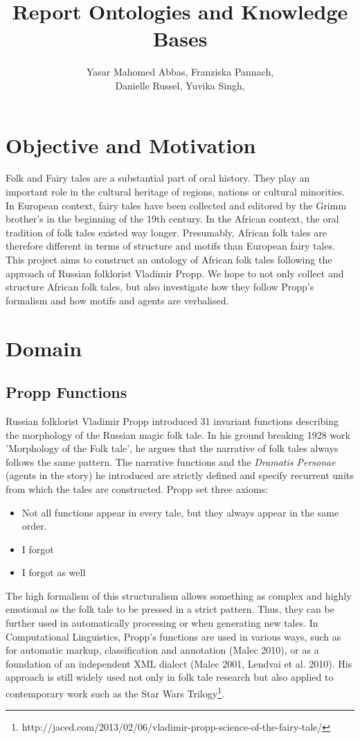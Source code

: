 \documentclass[10pt,a4paper]{article}
\author{Yasar Mahomed Abbas, Franziska Pannach, \\Danielle Russel, Yuvika Singh,}
\title{Report Ontologies and Knowledge Bases}
\begin{document}
\maketitle


\section{Objective and Motivation}
Folk and Fairy tales are a substantial part of oral history. They play an important role in the cultural heritage of regions, nations or cultural minorities. In European context, fairy tales have been collected and editored by the Grimm brother's in the beginning of the 19th century. In the African context, the oral tradition of folk tales existed way longer. Presumably, African folk tales are therefore different in terms of structure and motifs than European fairy tales. 
This project aims to construct an ontology of African folk tales following the approach of Russian folklorist Vladimir Propp. We hope to not only collect and structure African folk tales, but also investigate how they follow Propp's formalism and how motifs and agents are verbalised.  


\section{Domain}
	\subsection{Propp Functions} 
	Russian folklorist Vladimir Propp introduced 31 invariant functions describing the morphology of the Russian magic folk tale. In his ground breaking 1928 work 'Morphology of the Folk tale', he argues that the narrative of folk tales always follows the same pattern. The narrative functions and the \textit{Dramatis Personae} (agents in the story) he introduced are strictly defined and specify recurrent units from which the tales are constructed. 
	Propp set three axioms: 
	
	\begin{itemize}
		\item Not all functions appear in every tale, but they always appear in the same order. 
		\item 	I forgot
		
		\item I forgot as well 
	
	\end{itemize}
The high formalism of this structuralism allows something as complex and highly emotional as the folk tale to be pressed in a strict pattern. Thus, they can be further used in automatically processing or when generating new tales. In Computational Linguistics, Propp's functions are used in various ways, such as for automatic markup, classification and annotation (Malec 2010), or as a foundation of an independent XML dialect (Malec 2001,  Lendvai et al. 2010). 
	His approach is still widely used not only in folk tale research but also applied to contemporary work such as the Star Wars Trilogy\footnote{http://jaced.com/2013/02/06/vladimir-propp-science-of-the-fairy-tale/}.   
\end{document}
